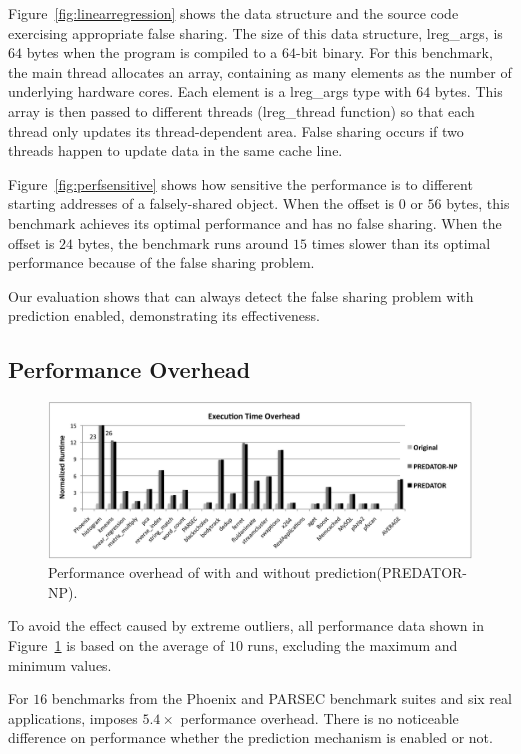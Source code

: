 Figure~\ref{fig:linearregression} shows the data structure and the source code exercising appropriate false sharing. The size of this data structure, lreg\_args, is $64$ bytes 
when the program is compiled to a $64$-bit binary. For this benchmark, the main thread allocates an array, containing as many elements as the number of underlying hardware cores. Each element is a lreg\_args type with $64$ bytes. This array is then passed to different threads (lreg\_thread function) so that each thread only updates its thread-dependent area. False sharing occurs if two threads happen to update data in the same cache line. 

Figure~\ref{fig:perfsensitive} shows how sensitive the performance is to different starting addresses of a falsely-shared object. When the offset is $0$ or $56$ bytes, this benchmark achieves its optimal performance and has no false sharing. When the offset is $24$ bytes, the benchmark runs around $15$ times slower than its optimal performance because of the false sharing problem.

Our evaluation shows that \Predator{} can always detect the false sharing problem with prediction enabled, demonstrating its effectiveness.

\subsection{Performance Overhead}
\label{sec:perfoverhead}

\begin{figure}[!t]
\centering
\includegraphics[width=6in]{predator/figure/perf}
\caption{
Performance overhead of \Predator{} with and without prediction(PREDATOR-NP).
\label{fig:perf}}
\end{figure}

To avoid the effect caused by extreme outliers, all performance data shown in Figure~\ref{fig:perf} is based on the average of $10$ runs, excluding the maximum and minimum values. 

For $16$ benchmarks from the Phoenix and PARSEC benchmark suites and six real applications, \Predator{} imposes $5.4\times$ performance overhead. There is no noticeable difference on performance whether the prediction mechanism is enabled or not. 
 
